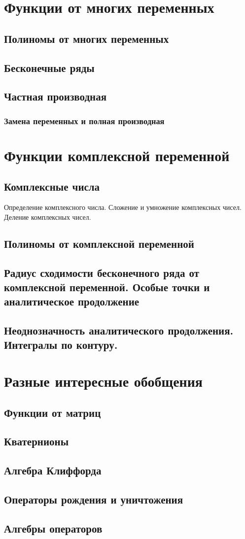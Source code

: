 \documentclass{article}
\begin{document}
\section{Функции от многих переменных}
\subsection{Полиномы от многих переменных}
\subsection{Бесконечные ряды}
\subsection{Частная производная}
\subsubsection{Замена переменных и полная производная}
\section{Функции комплексной переменной}
\subsection{Комплексные числа}
Определение комплексного числа. Сложение и умножение комплексных чисел. Деление комплексных чисел.
\subsection{Полиномы от комплексной переменной}
\subsection{Радиус сходимости бесконечного ряда от комплексной переменной. Особые точки и аналитическое продолжение}
\subsection{Неоднозначность аналитического продолжения. Интегралы по контуру.}

\section{Разные интересные обобщения}
\subsection{Функции от матриц}
\subsection{Кватернионы}
\subsection{Алгебра Клиффорда}
\subsection{Операторы рождения и уничтожения}
\subsection{Алгебры операторов}
\end{document}
